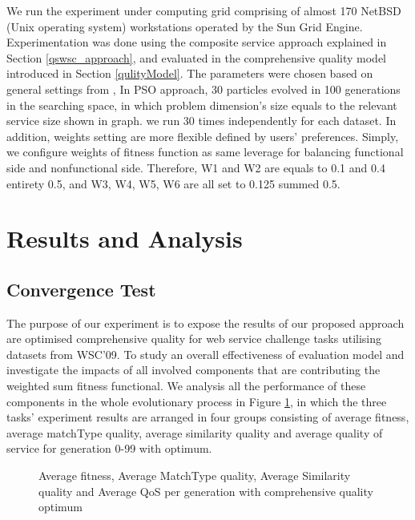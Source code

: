 \documentclass{llncs}
\begin{document}
We run the experiment under computing grid comprising of almost 170 NetBSD (Unix operating system) workstations operated by the Sun Grid Engine. Experimentation was done using the composite service approach explained in Section \ref{qswsc_approach}, and evaluated in the comprehensive quality model introduced in Section \ref{qulityModel}. The parameters were chosen based on general settings from \cite{shi2001particle}, In PSO approach, 30 particles evolved in 100 generations in the searching space, in which problem dimension's size equals to the relevant service size shown in graph. we run 30 times independently for each dataset. In addition, weights setting are more flexible defined by users' preferences. Simply, we configure weights of fitness function as same leverage for balancing functional side and nonfunctional side. Therefore, W1 and W2 are equals to 0.1 and 0.4 entirety 0.5,  and W3, W4, W5, W6 are all set to 0.125 summed 0.5.

\section{Results and Analysis}\label{results_analysis}
\subsection{Convergence Test}\label{convergenceTest}
The purpose of our experiment is to expose the results of our proposed approach are optimised comprehensive quality for web service challenge tasks utilising datasets from WSC’09. To study an overall effectiveness of evaluation model and investigate the impacts of all involved components that are contributing the weighted sum fitness functional. We analysis all the performance of these components in the whole evolutionary process in Figure \ref{exp_fitnessvalue}, in which the three tasks' experiment results are arranged in four groups consisting of average fitness, average matchType quality, average similarity quality and average quality of service for generation 0-99 with optimum.
\begin{figure}[h]
\centerline{
}
 \caption{Average fitness, Average MatchType quality, Average Similarity quality and Average QoS per generation with comprehensive quality optimum}
 \label{exp_fitnessvalue}
\end{figure}
\end{document}
